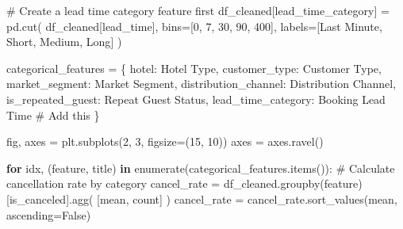 \documentclass[
  letterpaper,
  DIV=11,
  numbers=noendperiod]{scrartcl}
\newenvironment{Shaded}{\begin{snugshade}}{\end{snugshade}}
\newcommand{\BuiltInTok}[1]{\textcolor[rgb]{0.00,0.23,0.31}{#1}}
\newcommand{\CommentTok}[1]{\textcolor[rgb]{0.37,0.37,0.37}{#1}}
\newcommand{\ControlFlowTok}[1]{\textcolor[rgb]{0.00,0.23,0.31}{\textbf{#1}}}
\newcommand{\DecValTok}[1]{\textcolor[rgb]{0.68,0.00,0.00}{#1}}
\newcommand{\KeywordTok}[1]{\textcolor[rgb]{0.00,0.23,0.31}{\textbf{#1}}}
\newcommand{\NormalTok}[1]{\textcolor[rgb]{0.00,0.23,0.31}{#1}}
\newcommand{\OperatorTok}[1]{\textcolor[rgb]{0.37,0.37,0.37}{#1}}
\newcommand{\StringTok}[1]{\textcolor[rgb]{0.13,0.47,0.30}{#1}}
\newcommand{\VariableTok}[1]{\textcolor[rgb]{0.07,0.07,0.07}{#1}}
\renewenvironment{Shaded}{%
  \begin{tcolorbox}[%
    enhanced,%
    colback=codebg,%
    colframe=codebg,%
    borderline west={3pt}{0pt}{sectionblue},%
    fontupper=\small\ttfamily,%
    boxrule=0pt,%
    arc=0pt,%
    boxsep=5pt,%
    left=2mm,%
    right=2mm,%
    top=2mm,%
    bottom=2mm%
  ]%
}{%
  \end{tcolorbox}%
}
\begin{document}
\begin{Shaded}
\begin{Highlighting}[]
\CommentTok{\# Create a lead time category feature first}
\NormalTok{df\_cleaned[}\StringTok{\textquotesingle{}lead\_time\_category\textquotesingle{}}\NormalTok{] }\OperatorTok{=}\NormalTok{ pd.cut(}
\NormalTok{    df\_cleaned[}\StringTok{\textquotesingle{}lead\_time\textquotesingle{}}\NormalTok{], }
\NormalTok{    bins}\OperatorTok{=}\NormalTok{[}\DecValTok{0}\NormalTok{, }\DecValTok{7}\NormalTok{, }\DecValTok{30}\NormalTok{, }\DecValTok{90}\NormalTok{, }\DecValTok{400}\NormalTok{], }
\NormalTok{    labels}\OperatorTok{=}\NormalTok{[}\StringTok{\textquotesingle{}Last Minute\textquotesingle{}}\NormalTok{, }\StringTok{\textquotesingle{}Short\textquotesingle{}}\NormalTok{, }\StringTok{\textquotesingle{}Medium\textquotesingle{}}\NormalTok{, }\StringTok{\textquotesingle{}Long\textquotesingle{}}\NormalTok{]}
\NormalTok{)}

\NormalTok{categorical\_features }\OperatorTok{=}\NormalTok{ \{}
    \StringTok{\textquotesingle{}hotel\textquotesingle{}}\NormalTok{: }\StringTok{\textquotesingle{}Hotel Type\textquotesingle{}}\NormalTok{,}
    \StringTok{\textquotesingle{}customer\_type\textquotesingle{}}\NormalTok{: }\StringTok{\textquotesingle{}Customer Type\textquotesingle{}}\NormalTok{,}
    \StringTok{\textquotesingle{}market\_segment\textquotesingle{}}\NormalTok{: }\StringTok{\textquotesingle{}Market Segment\textquotesingle{}}\NormalTok{,}
    \StringTok{\textquotesingle{}distribution\_channel\textquotesingle{}}\NormalTok{: }\StringTok{\textquotesingle{}Distribution Channel\textquotesingle{}}\NormalTok{,}
    \StringTok{\textquotesingle{}is\_repeated\_guest\textquotesingle{}}\NormalTok{: }\StringTok{\textquotesingle{}Repeat Guest Status\textquotesingle{}}\NormalTok{,}
    \StringTok{\textquotesingle{}lead\_time\_category\textquotesingle{}}\NormalTok{: }\StringTok{\textquotesingle{}Booking Lead Time\textquotesingle{}}  \CommentTok{\# Add this}
\NormalTok{\}}

\NormalTok{fig, axes }\OperatorTok{=}\NormalTok{ plt.subplots(}\DecValTok{2}\NormalTok{, }\DecValTok{3}\NormalTok{, figsize}\OperatorTok{=}\NormalTok{(}\DecValTok{15}\NormalTok{, }\DecValTok{10}\NormalTok{))}
\NormalTok{axes }\OperatorTok{=}\NormalTok{ axes.ravel()}

\ControlFlowTok{for}\NormalTok{ idx, (feature, title) }\KeywordTok{in} \BuiltInTok{enumerate}\NormalTok{(categorical\_features.items()):}
    \CommentTok{\# Calculate cancellation rate by category}
\NormalTok{    cancel\_rate }\OperatorTok{=}\NormalTok{ df\_cleaned.groupby(feature)[}\StringTok{\textquotesingle{}is\_canceled\textquotesingle{}}\NormalTok{].agg(}
\NormalTok{        [}\StringTok{\textquotesingle{}mean\textquotesingle{}}\NormalTok{, }\StringTok{\textquotesingle{}count\textquotesingle{}}\NormalTok{]}
\NormalTok{    )}
\NormalTok{    cancel\_rate }\OperatorTok{=}\NormalTok{ cancel\_rate.sort\_values(}\StringTok{\textquotesingle{}mean\textquotesingle{}}\NormalTok{, ascending}\OperatorTok{=}\VariableTok{False}\NormalTok{)}
    

\end{Highlighting}
\end{Shaded}
\end{document}
